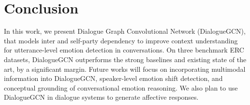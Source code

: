 \documentclass[11pt,a4paper]{article}
\begin{document}
\section{Conclusion}
\label{sec:conclusion}
In this work, we present Dialogue Graph Convolutional Network (DialogueGCN), that models inter and self-party dependency to improve context understanding for utterance-level emotion detection in conversations. On three benchmark ERC datasets, DialogueGCN outperforms the strong baselines and existing state of the art, by a significant margin. Future works will focus on incorporating multimodal information into DialogueGCN, speaker-level emotion shift detection, and conceptual grounding of conversational emotion reasoning. We also plan to use DialogueGCN in dialogue systems to generate affective responses.


\appendix
\end{document}
